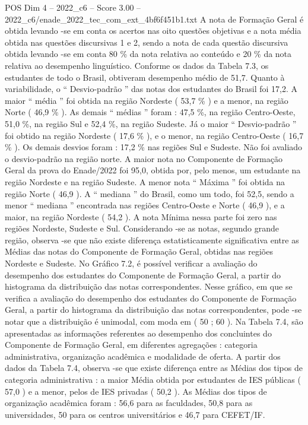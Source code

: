 \begin{textsample}{POS Dim 4 – 2022\_c6 – Score 3.00 – 2022\_c6/enade\_2022\_tec\_com\_ext\_4bf6f451b1.txt}
A nota de Formação Geral é obtida levando -se em conta os acertos nas oito questões objetivas e a nota média obtida nas questões discursivas 1 e 2, sendo a nota de cada questão discursiva obtida levando -se em conta 80 \% da nota relativa ao conteúdo e 20 \% da nota relativa ao desempenho linguístico.
Conforme os dados da Tabela 7.3, os estudantes de todo o Brasil, obtiveram desempenho médio de 51,7.
Quanto à variabilidade, o “ Desvio-padrão ” das notas dos estudantes do Brasil foi 17,2.
A maior “ média ” foi obtida na região Nordeste ( 53,7 \% ) e a menor, na região Norte ( 46,9 \% ).
As demais “ médias ” foram : 47,5 \%, na região Centro-Oeste, 51,0 \%, na região Sul e 52,4 \%, na região Sudeste.
Já o maior “ Desvio-padrão ” foi obtido na região Nordeste ( 17,6 \% ), e o menor, na região Centro-Oeste ( 16,7 \% ).
Os demais desvios foram : 17,2 \% nas regiões Sul e Sudeste.
Não foi avaliado o desvio-padrão na região norte.
A maior nota no Componente de Formação Geral da prova do Enade/2022 foi 95,0, obtida por, pelo menos, um estudante na região Nordeste e na região Sudeste.
A menor nota “ Máxima ” foi obtida na região Norte ( 46,9 ).
A “ mediana ” do Brasil, como um todo, foi 52,5, sendo a menor “ mediana ” encontrada nas regiões Centro-Oeste e Norte ( 46,9 ), e a maior, na região Nordeste ( 54,2 ).
A nota Mínima nessa parte foi zero nas regiões Nordeste, Sudeste e Sul.
Considerando -se as notas, segundo grande região, observa -se que não existe diferença estatisticamente significativa entre as Médias das notas do Componente de Formação Geral, obtidas nas regiões Nordeste e Sudeste.
No Gráfico 7.2, é possível verificar a avaliação do desempenho dos estudantes do Componente de Formação Geral, a partir do histograma da distribuição das notas correspondentes.
Nesse gráfico, em que se verifica a avaliação do desempenho dos estudantes do Componente de Formação Geral, a partir do histograma da distribuição das notas correspondentes, pode -se notar que a distribuição é unimodal, com moda em ( 50 ; 60 ).
Na Tabela 7.4, são apresentadas as informações referentes ao desempenho dos concluintes do Componente de Formação Geral, em diferentes agregações : categoria administrativa, organização acadêmica e modalidade de oferta.
A partir dos dados da Tabela 7.4, observa -se que existe diferença entre as Médias dos tipos de categoria administrativa : a maior Média obtida por estudantes de IES públicas ( 57,0 ) e a menor, pelos de IES privadas ( 50,2 ).
As Médias dos tipos de organização acadêmica foram : 56,6 para as faculdades, 50,8 para as universidades, 50 para os centros universitários e 46,7 para CEFET/IF.

\end{textsample}
